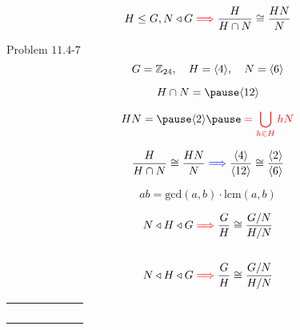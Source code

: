 \begin{frame}
  \begin{theorem}
	\[
	  H \le G, N \triangleleft G \textcolor{red}{\implies} \frac{H}{H \cap N} \cong \frac{HN}{N} 
	\]
  \end{theorem}

  \vspace{0.20cm}
  \begin{exampleblock}{Problem $11.4$-$7$}
	\[
	  G = \mathbb{Z}_{24},\quad H = \langle 4 \rangle,\quad N = \langle 6 \rangle
	\]
  \end{exampleblock}

  \pause
  \[
	H \cap N = \pause \langle 12 \rangle
  \]

  \pause
  \vspace{-0.80cm}
  \[
	HN = \pause \langle 2 \rangle \pause \;\red{= \bigcup_{h \in H} hN}
  \]

  \pause
  \[
	\frac{H}{H \cap N} \cong \frac{HN}{N} \textcolor{blue}{\implies} 
	\frac{\langle 4 \rangle}{\langle 12 \rangle} \cong \frac{\langle 2 \rangle}{\langle 6 \rangle}
  \]

  \pause
  \[
	ab = \text{gcd}(a, b) \cdot \text{lcm}(a,b)
  \]
\end{frame}

\begin{frame}
  \begin{theorem}
	\[
	  N \triangleleft H \triangleleft G \textcolor{red}{\implies} \frac{G}{H} \cong \frac{G/N}{H/N}
	\]
  \end{theorem}

  \begin{columns}
	  \pause
	  \pause
  \end{columns}
\end{frame}

\begin{frame}
  \begin{theorem}
	\[
	  N \triangleleft H \triangleleft G \textcolor{red}{\implies} \frac{G}{H} \cong \frac{G/N}{H/N}
	\]
  \end{theorem}

  \begin{table}[]
	\begin{tabular}{|c|c|c|c|c|c|}
	\hline
	 &  &  &  &  &  \\ \hline
	 &  &  &  &  &  \\ \hline
	 &  &  &  &  &  \\ \hline
	 &  &  &  &  &  \\ \hline
	 &  &  &  &  &  \\ \hline
	\end{tabular}
  \end{table}

  \begin{center}
  \end{center}
\end{frame}

